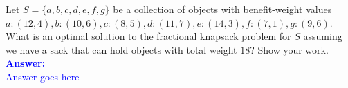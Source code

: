 \item{}
Let $S=\lbrace a,b,c,d,e,f,g\rbrace$ be a collection of objects with
benefit-weight values $a:(12,4), b:(10,6), c:(8,5), d:(11,7), e:(14,3), f:(7,1),
g:(9,6)$. What is an optimal solution to the fractional knapsack problem for $S$
assuming we have a sack that can hold objects with total weight $18$? Show your
work.\\[12pt]
\ifanswers
\textcolor{blue}{
\textbf{Answer:}\\[6pt]
Answer goes here
}
\newpage
\fi
